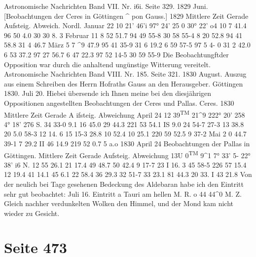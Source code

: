 \documentclass[10pt,a4paper]{article}
\begin{document}
Astronomische  Nachrichten  Band  VII.  Nr.  i6i.  Seite  329.     1829  Juni.
[Beobachtungen  der  Ceres  in  Göttingen  \textasciicircum{}
pon  Gauss.]
1829
Mittlere  Zeit
Gerade  Aufsteig. Abweich.  Nordl.
Januar    22
10\glqq{}  21\glqq{}'  46'i
97°  24'  25 \glqq{}0
30°  22'     o\glqq{}4
10      7    41.4
96    50      4.0
30    30      8. 3
Februar  11
8    52    51.7
94    49    55-8
30    58    55-4
8     20    52.8
94    41    58.8
31      4    46.7
März         5
7     \textasciicircum{}9    47.9
95     41     35-9
31       6     19.2
6    59    57-5
97      5      4-  0
31      2    42.0
6    53     37.2
97    27    56.7
6    47     22.3
97    52     14-5
30    59    55-9
Die  Beobachtungftder  Opposition  war  durch  die  anhaltend  ungünstige  Witterung  vereitelt.
Astronomische  Nachrichten  Band  VIII.  Nr.  185.  Seite  321.     1830  August.
Auszug  aus  einem  Schreiben  des  Herrn  Hofraths  Gauss  an  den  Herausgeber.    Göttingen  1830.  Juli  20.
Hiebei  übersende  ich  Ihnen  meine  bei  den  diesjährigen  Oppositionen  angestellten  Beobachtungen
der  Ceres  und  Pallas.
Ceres.
1830
Mittlere  Zeit
Gerade  A
ifsteig.
Abweichung
April  24
12\glqq{}   39\textsuperscript{TM}  21\textasciicircum{}9
222°  20'
25\glqq{}8
4°  18'  27\glqq{}6  S.
34    33-0
9.1
16    45.0
29    44.3
221     53
54.1
IS      9.0
24    54-7
27-3
13    38.8
20      5.0
58-3
12    14. 6
15     15-3
28.8
10    52.4
10    25.1
220    59
52.5
9    37-2
Mai       2
0    44.7
39-1
7    29.2
II    46    14.9
219    52
0.7
5      a.o
1830
April  24
Beobachtungen der  Pallas  in  Göttingen.
Mittlere  Zeit
Gerade  Aufsteig.
Abweichung
13U    0\textsuperscript{TM}   9\textasciicircum{}1
\glqq{}7°  33'     5\glqq{}\glqq{}-
22°  38'     i\glqq{}6  N.
12    55    26.1
21    17.4
49    48.7
50    42.4
9    17-7
23      I     16. 3
45     58-5
226    57    15.4
12    19.4
41     14.1
45       6.1
22    58.4
36    29.3
32    51-7
33     23.1
81     44.3
20    33.  I
43     21.8
Von  der  neulich  bei  Tage   gesehenen  Bedeckung  des  Aldebaran   habe   ich  den   Eintritt  sehr  gut
beobachtet:
Juli  16.     Eintritt  a  Tauri  am  hellen  M.  R.  o\glqq{}  44\glqq{}\glqq{}  44\textasciicircum{}0  M.  Z.
Gleich  nachher  verdunkelten  Wolken  den  Himmel,  und  der  Mond  kam  nicht  wieder  zu  Gesicht.

\newpage
\section*{Seite 473}
\end{document}
